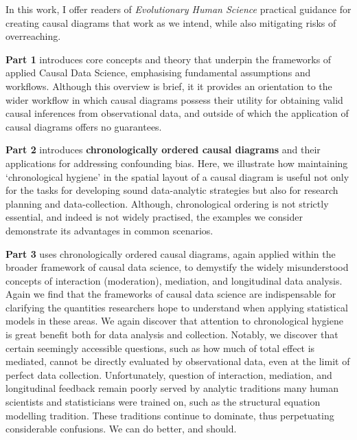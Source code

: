 \documentclass[
  singlecolumn,
  9pt]{article}
\begin{document}
In this work, I offer readers of \emph{Evolutionary Human Science}
practical guidance for creating causal diagrams that work as we intend,
while also mitigating risks of overreaching.

\textbf{Part 1} introduces core concepts and theory that underpin the
frameworks of applied Causal Data Science, emphasising fundamental
assumptions and workflows. Although this overview is brief, it it
provides an orientation to the wider workflow in which causal diagrams
possess their utility for obtaining valid causal inferences from
observational data, and outside of which the application of causal
diagrams offers no guarantees.

\textbf{Part 2} introduces \textbf{chronologically ordered causal
diagrams} and their applications for addressing confounding bias. Here,
we illustrate how maintaining `chronological hygiene' in the spatial
layout of a causal diagram is useful not only for the tasks for
developing sound data-analytic strategies but also for research planning
and data-collection. Although, chronological ordering is not strictly
essential, and indeed is not widely practised, the examples we consider
demonstrate its advantages in common scenarios.

\textbf{Part 3} uses chronologically ordered causal diagrams, again
applied within the broader framework of causal data science, to
demystify the widely misunderstood concepts of interaction (moderation),
mediation, and longitudinal data analysis. Again we find that the
frameworks of causal data science are indispensable for clarifying the
quantities researchers hope to understand when applying statistical
models in these areas. We again discover that attention to chronological
hygiene is great benefit both for data analysis and collection. Notably,
we discover that certain seemingly accessible questions, such as how
much of total effect is mediated, cannot be directly evaluated by
observational data, even at the limit of perfect data collection.
Unfortunately, question of interaction, mediation, and longitudinal
feedback remain poorly served by analytic traditions many human
scientists and statisticians were trained on, such as the structural
equation modelling tradition. These traditions continue to dominate,
thus perpetuating considerable confusions. We can do better, and should.
\end{document}
